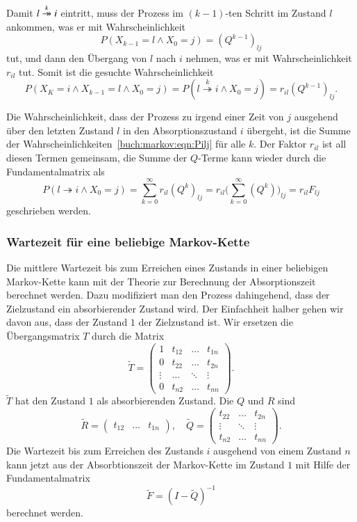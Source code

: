 Damit $l\overset{\smash{k}}{\twoheadrightarrow} i$ eintritt, muss der Prozess im $(k-1)$-ten Schritt im
Zustand $l$ ankommen, was er mit Wahrscheinlichkeit
\[
P(X_{k-1}=l\wedge X_0=j) = (Q^{k-1})_{l\!j}
\]
tut, und dann den Übergang von $l$ nach $i$ nehmen, was er mit
Wahrscheinlichkeit $r_{il}$ tut.
Somit ist die gesuchte Wahrscheinlichkeit
\begin{equation}
P(X_K=i\wedge X_{k-1}=l\wedge X_0=j)
=
P(l\overset{k}{\twoheadrightarrow} i\wedge X_0=j)
=
r_{il}(Q^{k-1})_{l\!j}.
\label{buch:markov:eqn:Pilj}
\end{equation}

Die Wahrscheinlichkeit, dass der Prozess zu irgend einer Zeit von $j$
ausgehend über den letzten Zustand $l$ in den Absorptionszustand $i$
übergeht, ist die Summe der Wahrscheinlichkeiten~\eqref{buch:markov:eqn:Pilj}
für alle $k$.
Der Faktor $r_{il}$ ist all diesen Termen gemeinsam, die Summe der
$Q$-Terme kann wieder durch die Fundamentalmatrix als
\[
P(l\twoheadrightarrow i\wedge X_0 = j)
=
\sum_{k=0}^\infty r_{il}(Q^k)_{l\!j}
=
r_{il}\biggl(\sum_{k=0}^\infty (Q^k)\biggr)_{l\!j}
=
r_{il}F_{l\!j}
\]
geschrieben werden.

\subsubsection{Wartezeit für eine beliebige Markov-Kette}
%
Die mittlere Wartezeit bis zum Erreichen eines Zustands in einer
beliebigen Markov-Kette kann mit der
Theorie zur Berechnung der Absorptionszeit berechnet werden.
Dazu modifiziert man den Prozess dahingehend, dass der Zielzustand
ein absorbierender Zustand wird.
Der Einfachheit halber gehen wir davon aus, dass der Zustand $1$ 
der Zielzustand ist.
Wir ersetzen die Übergangsmatrix $T$ durch die Matrix
\[
\tilde{T}
=
\left(
\begin{array}{c|ccc}
1     &t_{12}&\dots &t_{1n}\\
\hline
0     &t_{22}&\dots &t_{2n}\\
\vdots&\dots &\ddots&\vdots\\
0     &t_{n2}&\dots &t_{nn}
\end{array}\right).
\]
$\tilde{T}$ hat den Zustand $1$ als absorbierenden Zustand.
Die $Q$ und $R$ sind
\[
\tilde{R}
=
\begin{pmatrix}t_{12}&\dots&t_{1n}\end{pmatrix},
\quad
\tilde{Q}
=
\begin{pmatrix}
t_{22}&\dots &t_{2n}\\
\vdots&\ddots&\vdots\\
t_{n2}&\dots &t_{nn}
\end{pmatrix}.
\]
Die Wartezeit bis zum Erreichen des Zustands $i$ ausgehend von einem
Zustand $n$ kann jetzt aus der Absorbtionszeit der Markov-Kette
im Zustand $1$ mit Hilfe der Fundamentalmatrix
\[
\tilde{F} 
=
(I-\tilde{Q})^{-1}
\]
berechnet werden.


